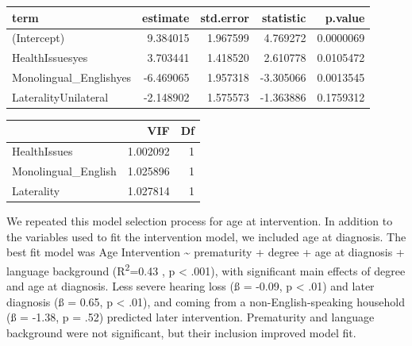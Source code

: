 \documentclass[english,man]{apa6}
\begin{document}
\begin{table}[H]
\centering
\begin{tabular}{l|r|r|r|r}
\hline
term & estimate & std.error & statistic & p.value\\
\hline
(Intercept) & 9.384015 & 1.967599 & 4.769272 & 0.0000069\\
\hline
HealthIssuesyes & 3.703441 & 1.418520 & 2.610778 & 0.0105472\\
\hline
Monolingual\_Englishyes & -6.469065 & 1.957318 & -3.305066 & 0.0013545\\
\hline
LateralityUnilateral & -2.148902 & 1.575573 & -1.363886 & 0.1759312\\
\hline
\end{tabular}
\end{table}

\begin{table}[H]
\centering
\begin{tabular}{l|r|r}
\hline
  & VIF & Df\\
\hline
HealthIssues & 1.002092 & 1\\
\hline
Monolingual\_English & 1.025896 & 1\\
\hline
Laterality & 1.027814 & 1\\
\hline
\end{tabular}
\end{table}

We repeated this model selection process for age at intervention. In addition to the variables used to fit the intervention model, we included age at diagnosis. The best fit model was Age Intervention \textasciitilde{} prematurity + degree + age at diagnosis + language background (R\textsuperscript{2}=0.43 , p \textless{} .001), with significant main effects of degree and age at diagnosis. Less severe hearing loss (ß = -0.09, p \textless{} .01) and later diagnosis (ß = 0.65, p \textless{} .01), and coming from a non-English-speaking household (ß = -1.38, p = .52) predicted later intervention. Prematurity and language background were not significant, but their inclusion improved model fit.
\end{document}
